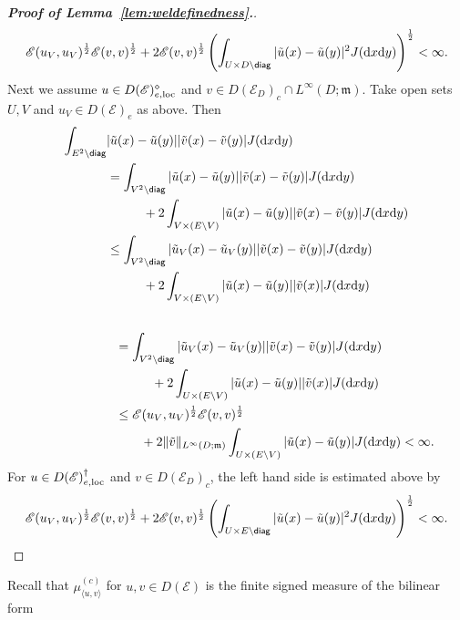 \documentclass[12pt,a4paper]{article}
\renewcommand{\d}{\mathrm{d}}
\newcommand{\m}{\mathfrak{m} }
\newcommand{\loc}{{\rm loc}}
\newcommand{\1}{{\bf 1}}
\begin{document}
\begin{proof}[{\bf Proof of Lemma~\ref{lem:weldefinedness}.}]
\begin{align*}
\mathscr{E}(u_V,u_V)^{\frac12}\mathscr{E}(v,v)^{\frac12}+2\mathscr{E}(v,v)^{\frac12}\left(\int_{U\times D\setminus{\sf diag}}|\tilde{u}(x)-\tilde{u}(y)|^2J({\d} x{\d} y) \right)^{\frac12}<\infty.
\end{align*}
Next we assume $u\in  
D(\mathscr{E})_{e,\loc}^{\diamond}$
and 
$v\in D(\mathscr{E}_D)_c\cap L^{\infty}(D;{\m})$. Take open sets $U,V$ and $u_V\in D(\mathscr{E})_e$ as above.  
Then 
\begin{align*}
\int_{E^2\setminus{\sf diag}}&|\tilde{u}(x)-\tilde{u}(y)||\tilde{v}(x)-\tilde{v}(y)|J({\d} x{\d} y)\\
&
=\int_{V^2\setminus{\sf diag}}|\tilde{u}(x)-\tilde{u}(y)||\tilde{v}(x)-\tilde{v}(y)|J({\d} x{\d} y)\\
&\hspace{1cm}+2\int_{V\times (E\setminus V)}|\tilde{u}(x)-\tilde{u}(y)||\tilde{v}(x)-\tilde{v}(y)|J({\d} x{\d} y)\\
&\leq\int_{V^2\setminus {\sf diag}}|\tilde{u}_V(x)-\tilde{u}_V(y)||\tilde{v}(x)-\tilde{v}(y)|J({\d} x{\d} y)\\
&\hspace{1cm}+2\int_{V\times (E\setminus V)}|\tilde{u}(x)-\tilde{u}(y)||\tilde{v}(x)
|J({\d} x{\d} y)
\end{align*}
\begin{align*}
\qquad\qquad\qquad&\qquad\\
&=\int_{V^2\setminus {\sf diag}}|\tilde{u}_V(x)-\tilde{u}_V(y)||\tilde{v}(x)-\tilde{v}(y)|J({\d} x{\d} y)\\
&\hspace{1cm}+2\int_{U\times (E\setminus V)}|\tilde{u}(x)-\tilde{u}(y)||\tilde{v}(x)
|J({\d} x{\d} y)\\
&\leq \mathscr{E}(u_V,u_V)^{\frac12}\mathscr{E}(v,v)^{\frac12}\\
&\qquad+2\|\tilde{v}\|_{L^{\infty}(D;{\m})}
\int_{U\times (E\setminus V)}|\tilde{u}(x)-\tilde{u}(y)|J({\d} x{\d} y)
<\infty.
\end{align*}
For $u\in D(\mathscr{E})_{e,\loc}^{\dag}$ and $v\in D(\mathscr{E}_D)_c$, the left hand side is estimated above by
\begin{align*}
\mathscr{E}(u_V,u_V)^{\frac12}\mathscr{E}(v,v)^{\frac12}+2\mathscr{E}(v,v)^{\frac12}\left(\int_{U\times E\setminus{\sf diag}}|\tilde{u}(x)-\tilde{u}(y)|^2J({\d} x{\d} y) \right)^{\frac12}<\infty.
\end{align*}
\end{proof}
Recall that $\mu_{\langle u,v\rangle}^{(c)}$ for $u,v\in D(\mathscr{E})$ is the finite signed measure of the bilinear form 
\end{document}
